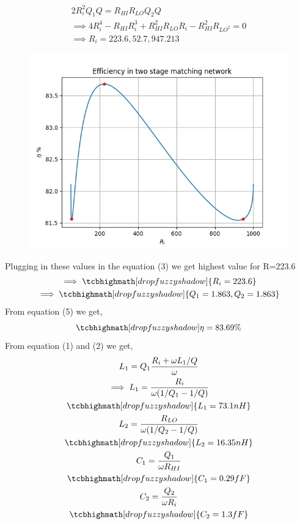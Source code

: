 \documentclass{article}
\begin{document}
\begin{gather}
2R_i^2Q_1Q = R_{HI}R_{LO}Q_2Q\\
\implies 4R_i^4 - R_{HI}R_i^3 + R_{HI}^2R_{LO}R_i - R_{HI}^2R_{LO^2} = 0\\
\implies R_i = 223.6, 52.7, 947.213
\end{gather}
\begin{figure}[H]
	\includegraphics[scale=0.8]{./figs/plot.jpg}
\end{figure}
Plugging in these values in the equation (3) we get highest value for R=223.6
\begin{gather}
\implies \tcbhighmath[drop fuzzy shadow]{R_i = 223.6}\\
\implies \tcbhighmath[drop fuzzy shadow]{Q_1 = 1.863, Q_2 = 1.863}
\end{gather}
From equation (5) we get,
\begin{equation}
	\tcbhighmath[drop fuzzy shadow]{\eta = 83.69 \%}
\end{equation}
From equation (1) and (2) we get,
\begin{gather}
	L_1 = Q_1\frac{R_i + \omega L_1/Q}{\omega}\\
	\implies L_1 = \frac{R_i}{\omega (1/Q_1 - 1/Q)}\\
	\tcbhighmath[drop fuzzy shadow]{L_1 = 73.1nH}\\
	L_2 = \frac{R_{LO}}{\omega (1/Q_2 - 1/Q)}\\
	\tcbhighmath[drop fuzzy shadow]{L_2 = 16.35nH}\\
	C_1 = \frac{Q_1}{\omega R_{HI}}\\
	\tcbhighmath[drop fuzzy shadow]{C_1 = 0.29fF}\\
	C_2 = \frac{Q_2}{\omega R_{i}}\\
	\tcbhighmath[drop fuzzy shadow]{C_2 = 1.3fF}
\end{gather}
\end{document}
